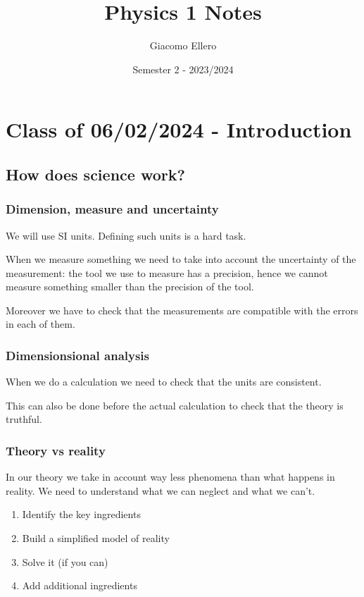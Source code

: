 \documentclass[10pt]{extarticle}
\title{Physics 1 Notes}
\author{Giacomo Ellero}
\date{Semester 2 - 2023/2024}
\begin{document}
\maketitle
\tableofcontents
\clearpage

\section{Class of 06/02/2024 - Introduction}

\subsection{How does science work?}

\subsubsection{Dimension, measure and uncertainty}

We will use SI units. Defining such units is a hard task.

When we measure something we need to take into account the uncertainty of the measurement:
the tool we use to measure has a precision, hence we cannot measure something smaller than the precision of the tool.

Moreover we have to check that the measurements are compatible with the errors in each of them.

\subsubsection{Dimensionsional analysis}

When we do a calculation we need to check that the units are consistent.

This can also be done before the actual calculation to check that the theory is truthful.

\subsubsection{Theory vs reality}

In our theory we take in account way less phenomena than what happens in reality.
We need to understand what we can neglect and what we can't.

\begin{enumerate}
  \item Identify the key ingredients
  \item Build a simplified model of reality
  \item Solve it (if you can)
  \item Add additional ingredients
\end{enumerate}
\end{document}
